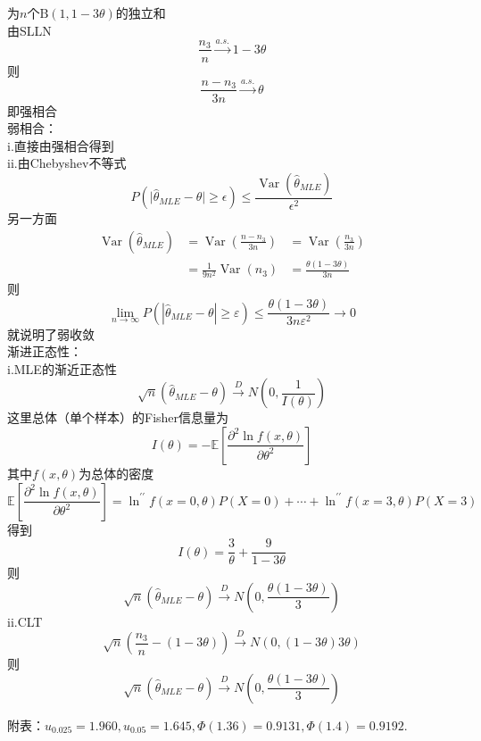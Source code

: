 \documentclass[UTF8,openany]{book}
\begin{document}
	为$n$个$\mathrm{B}(1,1-3\theta)$的独立和\\
	由SLLN
	\[
	\frac{n_3}{n} \xrightarrow{a.s.}1-3\theta
	\]
	则
	\[
	\frac{n-n_3}{3n} \xrightarrow{a.s.}\theta
	\]
	即强相合\\
	弱相合：\\
	i.直接由强相合得到\\
	ii.由Chebyshev不等式
	\[
	P\left(\mid \hat{\theta}_{MLE}-\theta \mid \ge \epsilon \right)\le \frac{\operatorname{Var}\left( \hat{\theta}_{MLE}\right) }{\epsilon^2} 
	\]
	另一方面
	\[
	\begin{aligned}
		\operatorname{Var}(\hat{\theta}_{MLE})&=\operatorname{Var}\left(\frac{n-n_3}{3 n}\right)  &=\operatorname{Var}\left(\frac{n_3}{3 n}\right)\\
		&=\frac{1}{9 n^2}\operatorname{Var}\left(n_3\right)&=\frac{\theta(1-3 \theta)}{3 n}
	\end{aligned}
	\]
	则
	\[
	\lim _{n \rightarrow \infty} P(|\hat{\theta}_{MLE}-\theta| \geq \varepsilon) \leqslant \frac{\theta(1-3 \theta)}{3 n \varepsilon^2} \rightarrow 0
	\]
	就说明了弱收敛\\
	渐进正态性：\\
	i.MLE的渐近正态性
	\[
	\sqrt{n}\left(\hat{\theta}_{MLE}-\theta \right)\xrightarrow{D} N\left(0,\frac{1}{I(\theta)} \right)  
	\]
	这里总体（单个样本）的Fisher信息量为
	\[
	I(\theta)=-\mathbb{E}[\frac{\partial^2 \ln f(x, \theta)}{\partial \theta^2}]
	\]
	其中$f(x, \theta)$为总体的密度
	\[
	\mathbb{E}[\frac{\partial^2 \ln f(x, \theta)}{\partial \theta^2}]=\ln ^{\prime \prime} f(x=0, \theta) P(X=0)+\cdots+\ln ^{\prime \prime} f(x=3, \theta) P(X=3)
	\]
	得到
	\[
	I(\theta)=\frac{3}{\theta}+\frac{9}{1-3\theta}
	\]
	则
	\[
	\sqrt{n}\left(\hat{\theta}_{MLE}-\theta \right)\xrightarrow{D} N\left(0,\frac{\theta(1-3\theta)}{3} \right) 
	\]
	ii.CLT
	\[
	\sqrt{n}\left(\frac{n_3}{n}-(1-3 \theta)\right) \xrightarrow{D} N(0,(1-3 \theta) 3 \theta) 
	\]
	则
	\[
	\sqrt{n}\left(\hat{\theta}_{MLE}-\theta \right)\xrightarrow{D} N\left(0,\frac{\theta(1-3\theta)}{3} \right) 
	\]
	
	
	\noindent 附表：$u_{0.025}=1.960, u_{0.05}=1.645, \Phi(1.36)=0.9131, \Phi(1.4)=0.9192$.
	\newpage
\end{document}
